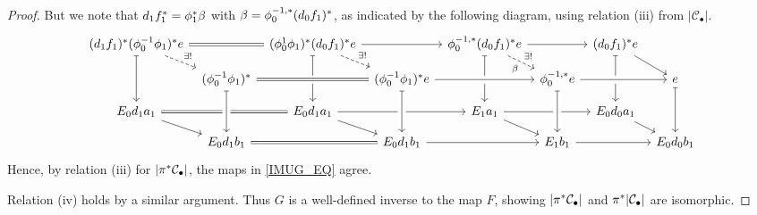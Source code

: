 \documentclass[a4paper,10pt
,draft
]{article}%
\renewcommand{\1}{\eta}%
\begin{document}
\begin{proof}
      But we note that $d_1 f_1^{\**} = \phi_1^{\**} \beta$ with $\beta = \phi_0^{-1,\**} (d_0 f_1)^{\**}$, as indicated by the following diagram, using relation (iii) from $|\mathcal C_\bullet|$.
      \begin{equation}
            \begin{tikzcd}[column sep = tiny, row sep = small]
                  (d_1 f_1)^{\**} (\phi_0^{-1} \phi_1)^{\**} e \arrow[rr, equal] \arrow[dd, mapsto] \arrow[dr, dashed, "\exists !"]
                  &&
                  (\phi_0^{\-1} \phi_1)^{\**} (d_0 f_1)^{\**} e \arrow[rr] \arrow[dd, mapsto] \arrow[dr, dashed, "\exists !"]
                  &&
                  \phi_0^{-1,\**} (d_0 f_1)^{\**} e \arrow[rr] \arrow[dd, mapsto] \arrow[dr, dashed, "\exists !", "\beta"']
                  &&
                  (d_0 f_1)^{\**} e \arrow[dr] \arrow[dd, mapsto]
                  \\
                  &
                  (\phi_0^{-1} \phi_1)^{\**} \arrow[rr, equal, crossing over]
                  &&
                  (\phi_0^{-1} \phi_1)^{\**} e \arrow[rr, crossing over]
                  &&
                  \phi_0^{-1,\**} e \arrow[rr, crossing over]
                  &&
                  e \arrow[dd, mapsto]
                  \\
                  E_0 d_1 a_1 \arrow[rr, equal] \arrow[dr]
                  &&
                  E_0 d_1 a_1 \arrow[dr] \arrow[rr]
                  &&
                  E_1 a_1 \arrow[rr] \arrow[dr]
                  &&
                  E_0 d_0 a_1 \arrow[dr]
                  \\
                  &
                  E_0 d_1 b_1 \arrow[uu, mapsfrom, crossing over] \arrow[rr, equal]
                  &&
                  E_0 d_1 b_1 \arrow[uu, mapsfrom, crossing over] \arrow[rr]
                  &&
                  E_1 b_1 \arrow[uu, mapsfrom, crossing over] \arrow[rr]
                  &&
                  E_0 d_0 b_1 
            \end{tikzcd}
      \end{equation}
      Hence, by relation (iii) for $|\pi^{\**} \mathcal C_\bullet|$, the maps in \eqref{IMUG_EQ} agree.

      Relation (iv) holds by a similar argument. Thus $G$ is a well-defined inverse to the map $F$, showing $|\pi^{\**} \mathcal C_\bullet|$ and $\pi^{\**}|\mathcal C_\bullet|$ are isomorphic.      


\end{proof}
\end{document}
